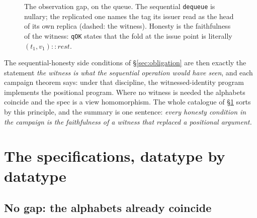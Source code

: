 \documentclass[11pt]{article}
\newcommand{\code}[1]{\texttt{#1}}
\newcommand{\deq}{\mathsf{deq}}
\begin{document}
\begin{figure}[h]
\centering
{}
\caption{The observation gap, on the queue. The sequential
\code{dequeue} is nullary; the replicated one names the tag its issuer
read as the head of its own replica (dashed: the witness). Honesty is
the faithfulness of the witness: \code{qOK} states that the fold at
the issue point is literally $(t_1, v_1) :: \mathit{rest}$.}
\label{fig:witness-queue}
\end{figure}

The sequential-honesty side conditions of \S\ref{sec:obligation} are
then exactly the statement \emph{the witness is what the sequential
operation would have seen}, and each campaign theorem says: under that
discipline, the witnessed-identity program implements the positional
program. Where no witness is needed the alphabets coincide and the
spec is a view homomorphism. The whole catalogue of
\S\ref{sec:specs} sorts by this principle, and the summary is one
sentence: \emph{every honesty condition in the campaign is the
faithfulness of a witness that replaced a positional argument.}

\section{The specifications, datatype by datatype}
\label{sec:specs}

\subsection{No gap: the alphabets already coincide}
\end{document}
